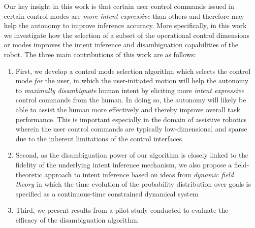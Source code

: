 \documentclass[journal]{IEEEtran}
\begin{document}
Our key insight in this work is that certain user control commands issued in certain control modes are \textit{more intent expressive} than others and therefore may help the autonomy to improve inference accuracy. 
More specifically, in this work we investigate how the selection of a subset of the operational control dimensions or modes improves the intent inference and disambiguation capabilities of the robot. 
The three main contributions of this work are as follows:
\begin{enumerate}
	\item First, we develop a control mode selection algorithm which selects the control mode \textit{for} the user, in which the user-initiated motion will help the autonomy to \textit{maximally disambiguate} human intent by eliciting more \textit{intent expressive} control commands from the human. In doing so, the autonomy will likely be able to assist the human more effectively and thereby improve overall task performance. This is important especially in the domain of assistive robotics wherein the user control commands are typically low-dimensional and sparse due to the inherent limitations of the control interfaces. 
	\item Second, as the disambiguation power of our algorithm is closely linked to the fidelity of the underlying intent inference mechanism, we also propose a field-theoretic approach to intent inference based on ideas from \textit{dynamic field theory} in which the time evolution of the probability distribution over goals is specified as a continuous-time constrained dynamical system 
	\item Third, we present results from a pilot study conducted to evaluate the efficacy of the disambiguation algorithm.
\end{enumerate}
\end{document}
